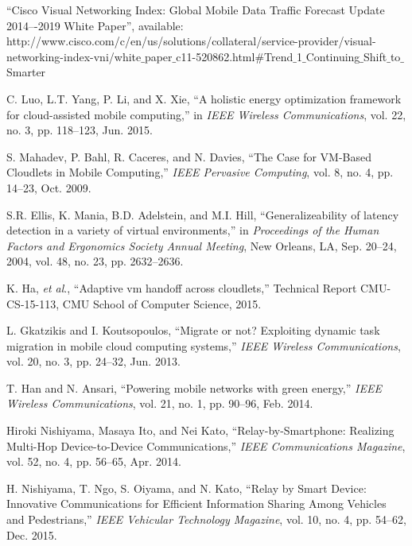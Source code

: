 \documentclass[journal,12pt,draftclsnofoot,onecolumn]{IEEEtran}
\begin{document}
\ifCLASSOPTIONcaptionsoff
  \newpage
\fi




\begin{thebibliography}{1}

``Cisco Visual Networking Index: Global Mobile Data Traffic Forecast Update 2014–-2019 White Paper'', available: http://www.cisco.com/c/en/us/solutions/collateral/service-provider/visual-networking-index-vni/white$\_$paper$\_$c11-520862.html$\#$Trend$\_$1$\_$Continuing$\_$Shift$\_$to$\_$Smarter

C. Luo, L.T. Yang, P. Li, and X. Xie, ``A holistic energy optimization framework for cloud-assisted mobile computing,'' in \emph{IEEE Wireless Communications}, vol. 22, no. 3, pp. 118--123, Jun. 2015.

S. Mahadev, P. Bahl, R. Caceres, and N. Davies, ``The Case for VM-Based Cloudlets in Mobile Computing,'' \emph{IEEE Pervasive Computing}, vol. 8, no. 4, pp. 14--23, Oct. 2009.

S.R. Ellis, K. Mania, B.D. Adelstein, and M.I. Hill, ``Generalizeability of latency detection in a variety of virtual environments,'' in \emph{Proceedings of the Human Factors and Ergonomics Society Annual Meeting}, New Orleans, LA, Sep. 20--24, 2004, vol. 48, no. 23, pp. 2632--2636.

K. Ha, \emph{et al}., ``Adaptive vm handoff across cloudlets,'' Technical Report CMU-CS-15-113, CMU School of Computer Science, 2015.

L. Gkatzikis and I. Koutsopoulos, ``Migrate or not? Exploiting dynamic task migration in mobile cloud computing systems,'' \emph{IEEE Wireless Communications}, vol. 20, no. 3, pp. 24--32, Jun. 2013.

T. Han and N. Ansari, ``Powering mobile networks with green energy,'' \emph{IEEE Wireless Communications}, vol. 21, no. 1, pp. 90--96, Feb. 2014.

Hiroki Nishiyama, Masaya Ito, and Nei Kato, ``Relay-by-Smartphone: Realizing Multi-Hop Device-to-Device Communications,'' \emph{IEEE Communications Magazine}, vol. 52, no. 4, pp. 56--65, Apr. 2014.

H. Nishiyama, T. Ngo, S. Oiyama, and N. Kato, ``Relay by Smart Device: Innovative Communications for Efficient Information Sharing Among Vehicles and Pedestrians,'' \emph{IEEE Vehicular Technology Magazine}, vol. 10, no. 4, pp. 54--62, Dec. 2015.




\end{thebibliography}
\end{document}
